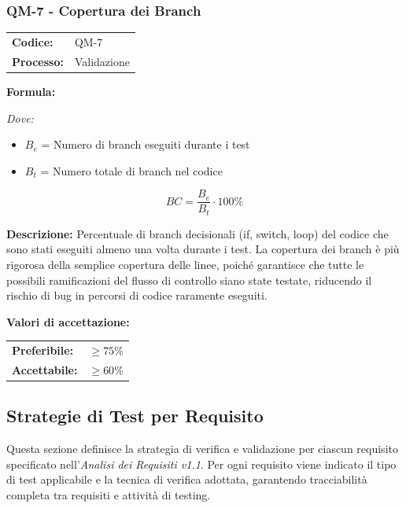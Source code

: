 \documentclass[a4paper,11pt,oneside]{scrartcl}
\begin{document}
\subsubsection{QM-7 - Copertura dei Branch}

\noindent
\begin{tabular}{@{}p{}p{}@{}}
\textbf{Codice:} & QM-7 \\
\textbf{Processo:} & Validazione \\
\end{tabular}

\vspace{0.3cm}
\noindent\textbf{Formula:}

\noindent\textit{Dove:}
\begin{itemize}[leftmargin=1.5cm, topsep=0pt, itemsep=0pt]
    \item $B_e$ = Numero di branch eseguiti durante i test
    \item $B_t$ = Numero totale di branch nel codice
\end{itemize}

\[
BC = \frac{B_e}{B_t} \cdot 100\%
\]

\noindent\textbf{Descrizione:} Percentuale di branch decisionali (if, switch, loop) del codice che sono stati eseguiti almeno una volta durante i test. La copertura dei branch è più rigorosa della semplice copertura delle linee, poiché garantisce che tutte le possibili ramificazioni del flusso di controllo siano state testate, riducendo il rischio di bug in percorsi di codice raramente eseguiti.

\vspace{0.2cm}
\noindent\textbf{Valori di accettazione:}
\vspace{0.1cm}

\noindent
\begin{tabular}{@{}ll@{}}
\textbf{Preferibile:} & $\ge 75\%$ \\
\textbf{Accettabile:} & $\ge 60\%$ \\
\end{tabular}

\subsection{Strategie di Test per Requisito}

Questa sezione definisce la strategia di verifica e validazione per ciascun requisito specificato nell'\textit{Analisi dei Requisiti v1.1}. Per ogni requisito viene indicato il tipo di test applicabile e la tecnica di verifica adottata, garantendo tracciabilità completa tra requisiti e attività di testing{\scriptsize{}}.
\end{document}

